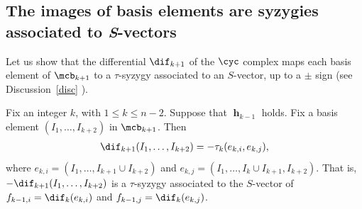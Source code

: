 \subsection{The images  of basis elements 
are syzygies associated to {\em S}-vectors} %

 Let us show that the differential $\dif_{k+1}$ of the $\cyc$
complex maps each basis element of $\mcb_{k+1}$ to a $\tau$-syzygy
associated to an $S$-vector, up to a $\pm$ sign (see
Discussion~\ref{disc} ).

\begin{proposition}\label{tau}
Fix an integer $k$, with $1\leq k\leq n-2$. Suppose that $\mbfh_{k-1}$
holds. Fix a basis element $(I_1,\ldots ,I_{k+2})$ in $\mcb_{k+1}$.
Then
\begin{eqnarray*}
\dif_{k+1}(I_1,\ldots,I_{k+2})=-\tau_{k}(e_{k,i},e_{k,j}),
\end{eqnarray*}
where $e_{k,i}=(I_1,\ldots ,I_{k+1}\cup I_{k+2})$ and
$e_{k,j}=(I_1,\ldots,I_{k}\cup I_{k+1},I_{k+2})$. That is,
$-\dif_{k+1}(I_1,\ldots,I_{k+2})$ is a $\tau$-syzygy associated to the
$S$-vector of $f_{k-1,i}=\dif_{k}(e_{k,i})$ and
$f_{k-1,j}=\dif_{k}(e_{k,j})$.
\end{proposition}
